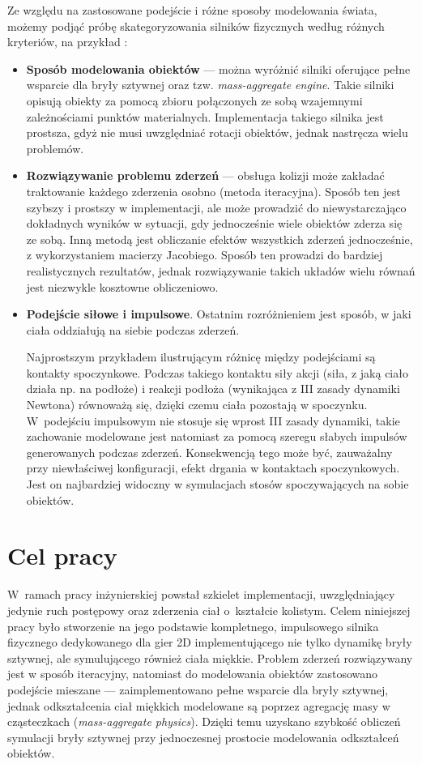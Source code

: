 Ze względu na zastosowane podejście i różne sposoby modelowania świata, możemy podjąć próbę skategoryzowania silników fizycznych według różnych kryteriów, na przykład \cite{bib:millington}:
\begin{itemize}
	\item \textbf{Sposób modelowania obiektów} --- można wyróżnić silniki oferujące pełne wsparcie dla bryły sztywnej oraz tzw. \textit{mass-aggregate engine}. Takie silniki opisują obiekty za pomocą zbioru połączonych ze sobą wzajemnymi zależnościami punktów materialnych. Implementacja takiego silnika jest prostsza, gdyż nie musi uwzględniać rotacji obiektów, jednak nastręcza wielu problemów.
	\item \textbf{Rozwiązywanie problemu zderzeń} --- obsługa kolizji może zakładać traktowanie każdego zderzenia osobno (metoda iteracyjna). Sposób ten jest szybszy i prostszy w implementacji, ale może prowadzić do niewystarczająco dokładnych wyników w sytuacji, gdy jednocześnie wiele obiektów zderza się ze sobą. Inną metodą jest obliczanie efektów wszystkich zderzeń jednocześnie, z wykorzystaniem macierzy Jacobiego. Sposób ten prowadzi do bardziej realistycznych rezultatów, jednak rozwiązywanie takich układów wielu równań jest niezwykle kosztowne obliczeniowo. 
	\item \textbf{Podejście siłowe i impulsowe}. Ostatnim rozróżnieniem jest sposób, w jaki ciała oddziałują na siebie podczas zderzeń. 
	
	Najprostszym przykładem ilustrującym różnicę między podejściami są kontakty spoczynkowe. Podczas takiego kontaktu siły akcji (siła, z jaką ciało działa np. na podłoże) i reakcji podłoża (wynikająca z III zasady dynamiki Newtona) równoważą się, dzięki czemu ciała pozostają w spoczynku. W~podejściu impulsowym nie stosuje się wprost III zasady dynamiki, takie zachowanie modelowane jest natomiast za pomocą szeregu słabych impulsów generowanych podczas zderzeń. Konsekwencją tego może być, zauważalny przy niewłaściwej konfiguracji, efekt drgania w kontaktach spoczynkowych. Jest on najbardziej widoczny w symulacjach stosów spoczywających na sobie obiektów. 
\end{itemize}

\section{Cel pracy}
W~ramach pracy inżynierskiej \cite{bib:inz} powstał szkielet implementacji, uwzględniający jedynie ruch postępowy oraz zderzenia ciał o~kształcie kolistym. Celem niniejszej pracy było stworzenie na jego podstawie kompletnego, impulsowego silnika fizycznego dedykowanego dla gier 2D implementującego nie tylko dynamikę bryły sztywnej, ale symulującego również ciała miękkie. Problem zderzeń rozwiązywany jest w sposób iteracyjny, natomiast do modelowania obiektów zastosowano podejście mieszane --- zaimplementowano pełne wsparcie dla bryły sztywnej, jednak odkształcenia ciał miękkich modelowane są poprzez agregację masy w cząsteczkach (\textit{mass-aggregate physics}). Dzięki temu uzyskano szybkość obliczeń symulacji bryły sztywnej przy jednoczesnej prostocie modelowania odkształceń obiektów.

